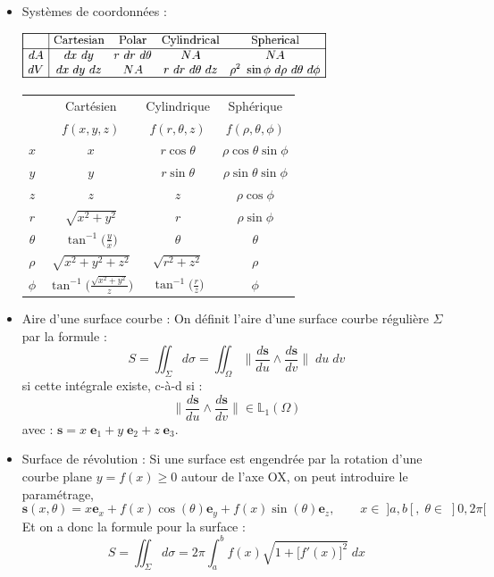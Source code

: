 \documentclass[a4paper]{article}
\begin{document}
\begin{itemize}
\item Systèmes de coordonnées : 
\begin{center} \includegraphics[width=9cm]{dAdV.png} \end{center}
\begin{center} \begin{tabular}{|c|ccc|} \hline
& Cartésien & Cylindrique & Sphérique \\
& $ f(x, y, z) $ & $ f(r, \theta, z) $ & $ f(\rho, \theta, \phi) $ \\ \hline
$ x $ & $ x $ & $ r \cos \theta $ & $ \rho \cos \theta \sin \phi $ \\
$ y $ & $ y $ & $ r \sin \theta $ & $ \rho \sin \theta \sin \phi $ \\
$ z $ & $ z $ & $ z $ & $ \rho \cos \phi $ \\
$ r $ & $ \sqrt{x^2 + y^2} $ & $ r $ & $ \rho \sin \phi $ \\
$ \theta $ & $\displaystyle \tan^{-1} \bigg( \frac{y}{x} \bigg) $ & $ \theta $ & $ \theta $ \\
$ \rho $ & $ \sqrt{x^2 + y^2 + z^2} $ & $ \sqrt{r^2 + z^2} $ & $ \rho $ \\
$ \phi $ & $\displaystyle \tan^{-1} \bigg( \frac{\sqrt{x^2 + y^2}}{z} \bigg) $ & $\displaystyle \tan^{-1} \bigg( \frac{r}{z} \bigg) $ & $ \phi $ \\ \hline
\end{tabular} \end{center}





\item Aire d'une surface courbe : On définit l'aire d'une surface courbe régulière $ \Sigma $ par la formule : 
\[ S = \iint_\Sigma d \sigma = \iint_\Omega \bigg\| \frac{d \textbf{s}}{d u} \wedge \frac{d \textbf{s}}{d v} \bigg\| \; d u \; d v \]
si cette intégrale existe, c-à-d si : 
\[  \bigg\| \frac{d \textbf{s}}{d u} \wedge \frac{d \textbf{s}}{d v} \bigg\| \in \mathbb{L}_1(\Omega) \]
avec : $ \textbf{s} = x \; \textbf{e}_1 + y \; \textbf{e}_2 + z \; \textbf{e}_3 $.





\item Surface de révolution : Si une surface est engendrée par la rotation d'une courbe plane $ y = f(x) \geq 0 $ autour de l'axe OX, on peut introduire le paramétrage, 
\[ \textbf{s}(x, \theta) = x \textbf{e}_x + f(x) \cos(\theta) \textbf{e}_y + f(x) \sin(\theta) \textbf{e}_z, \qquad x \in \; ]a, b[, \; \theta \in \; ]0, 2 \pi[ \]
Et on a donc la formule pour la surface : 
\[ S = \iint_\Sigma d \sigma = 2 \pi \int_a^b f(x) \sqrt{1 + \big[ f'(x) \big]^2} \; d x \]






\end{itemize}
\end{document}
